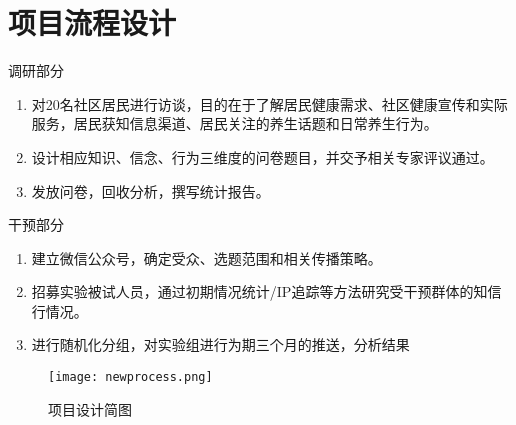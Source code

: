 \section{项目流程设计}
\begin{frame}{调研部分}
\begin{enumerate}
    \item 对20名社区居民进行访谈，目的在于了解居民健康需求、社区健康宣传和实际服务，居民获知信息渠道、居民关注的养生话题和日常养生行为。
    \item 设计相应知识、信念、行为三维度的问卷题目，并交予相关专家评议通过。
    \item 发放问卷，回收分析，撰写统计报告。
\end{enumerate}
\end{frame}
\begin{frame}{干预部分}
\begin{enumerate}
    \item 建立微信公众号，确定受众、选题范围和相关传播策略。
    \item 招募实验被试人员，通过初期情况统计/IP追踪等方法研究受干预群体的知信行情况。
    \item 进行随机化分组，对实验组进行为期三个月的推送，分析结果
\end{enumerate}
\begin{figure}[th]
    \texttt{[image: newprocess.png]}
    \centering
    \caption{项目设计简图}
\end{figure}
\end{frame}
